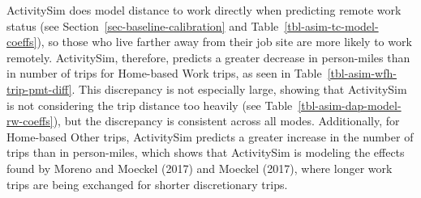 \documentclass[fancy, oneside, mastersfancy, ms]{byuthesis}
\begin{document}
ActivitySim does model distance to work directly when predicting remote
work status (see Section~\ref{sec-baseline-calibration} and
Table~\ref{tbl-asim-tc-model-coeffs}), so those who live farther away
from their job site are more likely to work remotely. ActivitySim,
therefore, predicts a greater decrease in person-miles than in number of
trips for Home-based Work trips, as seen in
Table~\ref{tbl-asim-wfh-trip-pmt-diff}. This discrepancy is not
especially large, showing that ActivitySim is not considering the trip
distance too heavily (see Table~\ref{tbl-asim-dap-model-rw-coeffs}), but
the discrepancy is consistent across all modes. Additionally, for
Home-based Other trips, ActivitySim predicts a greater increase in the
number of trips than in person-miles, which shows that ActivitySim is
modeling the effects found by Moreno and Moeckel (2017) and Moeckel
(2017), where longer work trips are being exchanged for shorter
discretionary trips.
\end{document}
